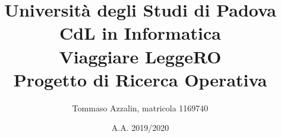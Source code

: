 \documentclass[10pt]{article}
\title{Università degli Studi di Padova \\ CdL in Informatica \\ \textbf{Viaggiare LeggeRO} \\ Progetto di Ricerca Operativa}
\author{Tommaso Azzalin, matricola 1169740}
\date{A.A. 2019/2020}
\begin{document}
\renewcommand{\abstractname}{Abstract}
\renewcommand{\contentsname}{Indice}

\maketitle
\begin{abstract}
    
\end{abstract}
\clearpage

\tableofcontents
\clearpage





\clearpage
\end{document}
